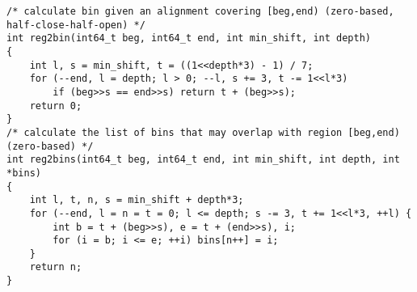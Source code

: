 \documentclass[10pt]{article}
\begin{document}
{\small
\begin{verbatim}
/* calculate bin given an alignment covering [beg,end) (zero-based, half-close-half-open) */
int reg2bin(int64_t beg, int64_t end, int min_shift, int depth)
{
    int l, s = min_shift, t = ((1<<depth*3) - 1) / 7;
    for (--end, l = depth; l > 0; --l, s += 3, t -= 1<<l*3)
        if (beg>>s == end>>s) return t + (beg>>s);
    return 0;
}
/* calculate the list of bins that may overlap with region [beg,end) (zero-based) */
int reg2bins(int64_t beg, int64_t end, int min_shift, int depth, int *bins)
{
    int l, t, n, s = min_shift + depth*3;
    for (--end, l = n = t = 0; l <= depth; s -= 3, t += 1<<l*3, ++l) {
        int b = t + (beg>>s), e = t + (end>>s), i;
        for (i = b; i <= e; ++i) bins[n++] = i;
    }
    return n;
}
\end{verbatim}
}
\end{document}

